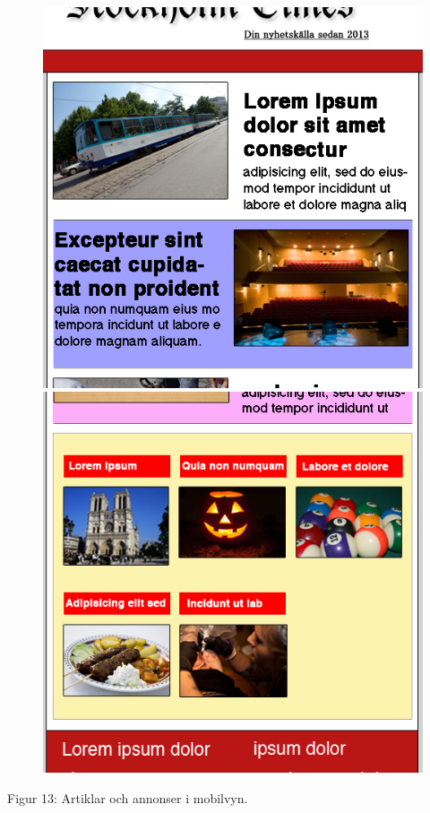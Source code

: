 \documentclass[11pt]{article}
\begin{document}
\begin{figure}[H]
\centerline{%
\includegraphics[scale=0.35]{pics/artikelmobil.png}\hspace{2em}%
\includegraphics[scale=0.35]{pics/annonsmobil.png}%
}
\end{figure}
\hspace{0.5cm}Figur 13: Artiklar och annonser i mobilvyn.
\end{document}
